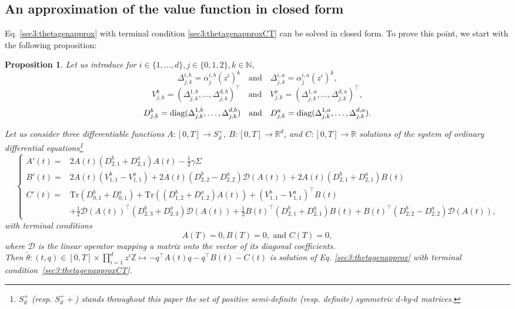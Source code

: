 \documentclass[preprint, 3p]{elsarticle}
\newcommand{\1}{{\chi}}
\newtheorem{proposition}{Proposition}
\begin{document}
\subsection{An approximation of the value function in closed form}
\vspace{3mm}
Eq. \eqref{sec3:thetagenapprox} with terminal condition \eqref{sec3:thetagenapproxCT} can be solved in closed form. To prove this point, we start with the following proposition:

\begin{proposition}
\label{sec3:ansatz}
Let us introduce for $i \in \{1, \ldots, d\}, j \in \{0, 1, 2\}, k \in \mathbb{N}$,
$$\Delta_{j,k}^{i,b} = \alpha^{i,b}_j (z^i)^k \quad \text{and} \quad \Delta_{j,k}^{i,a} = \alpha^{i,a}_j (z^i)^k,$$
$$V^b_{j,k} = \left(\Delta_{j,k}^{1,b},\ldots,\Delta_{j,k}^{d,b}\right)^\intercal \quad \text{and} \quad V^a_{j,k} = \left(\Delta_{j,k}^{1,a},\ldots,\Delta_{j,k}^{d,a}\right)^\intercal,$$
\begin{equation*}
D^b_{j,k} = \textup{diag}(\Delta_{j,k}^{1,b}, \ldots, \Delta_{j,k}^{d,b}) \quad \text{and} \quad D^a_{j,k} = \textup{diag}(\Delta_{j,k}^{1,a}, \ldots, \Delta_{j,k}^{d,a}).
\end{equation*}

Let us consider three differentiable functions $A: [0,T] \to S_d^{+}$, $B:
[0,T] \to \mathbb{R}^d$, and $C: [0,T] \to \mathbb R$ solutions of the system of
ordinary differential equations\footnote{$S_d^{+}$ (resp. $S_d^++$) stands throughout this paper 
the set of positive semi-definite (resp. definite) symmetric $d$-by-$d$
matrices.}
\begin{equation}\label{system:ABC}
\begin{cases}
\displaystyle
{A'}(t) = & 2 A(t)\left(D^b_{2,1} + D^a_{2,1}\right) A(t) - \frac{1}{2} \gamma \Sigma \\
{B'}(t) = &  2 A(t) \left(V^b_{1,1} - V^a_{1,1}\right) + 2A(t)\left(D^b_{2,2} - D^a_{2,2}\right) \mathcal{D}(A(t)) + 2 A(t)\left(D^b_{2,1} + D^a_{2,1}\right) B(t) \\
{C'}(t) = & \textrm{Tr}\left(D^b_{0,1} + D^a_{0,1}\right) +\textrm{Tr}\left(\left(D^b_{1,2} + D^a_{1,2}\right) A(t)\right) + \left(V^b_{1,1} - V^a_{1,1}\right)^\intercal B(t) \\
          & + \frac 12 \mathcal{D}(A(t))^\intercal \left(D^b_{2,3} + D^a_{2,3}\right) \mathcal{D}(A(t)) + \frac 12 B(t)^\intercal \left(D^b_{2,1} + D^a_{2,1}\right) B(t) + B(t)^\intercal \left(D^b_{2,2} - D^a_{2,2}\right) \mathcal{D}(A(t)),
\end{cases}
\end{equation}
with terminal conditions
\begin{equation}
\label{system:ABCCT}
A(T) = 0, B(T) = 0, \textrm{ and } C(T) = 0,
\end{equation} where $\mathcal{D}$ is the linear operator mapping a matrix onto the vector of its diagonal coefficients.\\

Then $\check{\theta}: (t,q) \in [0,T] \times \prod_{i=1}^d z^i \mathbb Z \mapsto -q^\intercal A(t) q - q^\intercal B(t) -  C(t)$ is solution of Eq. \eqref{sec3:thetagenapprox} with terminal condition~\eqref{sec3:thetagenapproxCT}.
\end{proposition}
\end{document}
